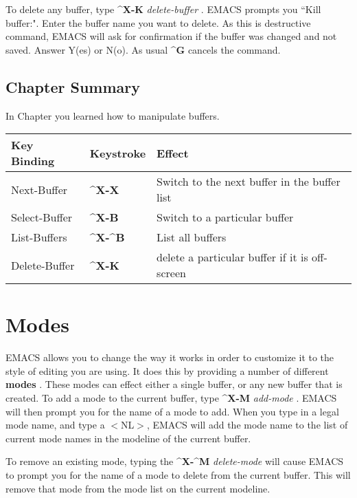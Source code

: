 To delete any buffer, type {\bf{}\^{}X-K} {\it{}delete-buffer}
.  EMACS prompts you ``Kill buffer:".  Enter the
buffer name you want to delete.  As this is destructive command, EMACS
will ask for confirmation if the buffer was changed and not saved.
Answer Y(es) or N(o).  As usual {\bf{}\^{}G} cancels the command.

\section{Chapter \thechapter{} Summary}

In Chapter \thechapter{} you learned how to manipulate buffers.

\begin{tabular}{llp{4in}}
Key Binding & Keystroke & Effect\\ \hline

Next-Buffer & {\bf{}\^{}X-X} & Switch to the next buffer in the buffer
list\\

Select-Buffer & {\bf{}\^{}X-B} & Switch to a particular buffer\\

List-Buffers & {\bf{}\^{}X-\^{}B} & List all buffers\\

Delete-Buffer & {\bf{}\^{}X-K} & delete a particular buffer if it is
off-screen\\

\end{tabular}
\chapter{Modes}

EMACS allows you to change the way it works in order to customize it
to the style of editing you are using.  It does this by providing a
number of different {\bf{}modes} .  These modes can
effect either a single buffer, or any new buffer that is created.  To
add a mode to the current buffer, type {\bf{}\^{}X-M} {\it{}add-mode}
.  EMACS will then prompt you for the name of a mode
to add.  When you type in a legal mode name, and type a $<${}NL$>${},
EMACS will add the mode name to the list of current mode names in the
modeline of the current buffer.

To remove an existing mode, typing the {\bf{}\^{}X-\^{}M} {\it{}delete-mode}
 will cause EMACS to prompt you for the name of a
mode to delete from the current buffer.  This will remove that mode from
the mode list on the current modeline.

